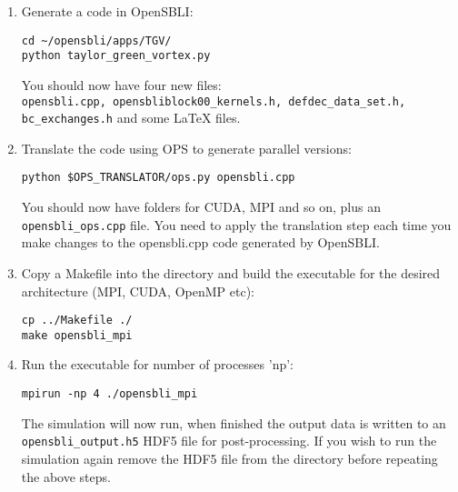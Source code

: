 \documentclass[11pt]{article}
\begin{document}
\begin{enumerate}
\item{Generate a code in OpenSBLI:}
\begin{verbatim}
cd ~/opensbli/apps/TGV/
python taylor_green_vortex.py
\end{verbatim}
You should now have four new files:\\ \verb|opensbli.cpp, opensbliblock00_kernels.h, defdec_data_set.h, bc_exchanges.h| and some LaTeX files.
\item{Translate the code using OPS to generate parallel versions:}
\begin{verbatim}
python $OPS_TRANSLATOR/ops.py opensbli.cpp
\end{verbatim}
You should now have folders for CUDA, MPI and so on, plus an \verb|opensbli_ops.cpp| file. You need to apply the translation step each time you make changes to the opensbli.cpp code generated by OpenSBLI. 

\item{Copy a Makefile into the directory and build the executable for the desired architecture (MPI, CUDA, OpenMP etc):}
\begin{verbatim}
cp ../Makefile ./
make opensbli_mpi
\end{verbatim}

\item{Run the executable for number of processes 'np':}
\begin{verbatim}
mpirun -np 4 ./opensbli_mpi
\end{verbatim}
The simulation will now run, when finished the output data is written to an \verb|opensbli_output.h5| HDF5 file for post-processing. If you wish to run the simulation again remove the HDF5 file from the directory before repeating the above steps.

\end{enumerate}
\end{document}

